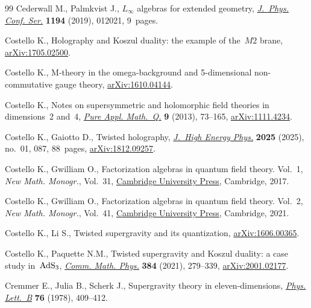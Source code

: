 \documentclass[10pt,a4paper]{amsart}
\numberwithin{equation}{section}
\theoremstyle{definition}
\begin{document}
\begin{thebibliography}{99}
Cederwall M., Palmkvist J., {$L_\infty$} algebras for extended geometry,
 \href{https://doi.org/10.1088/1742-6596/1194/1/012021}{\textit{J.~Phys. Conf.
 Ser.}} \textbf{1194} (2019), 012021, 9~pages.

Costello K., Holography and Koszul duality: the example of the~$M2$ brane,
 \href{http://arxiv.org/abs/1705.02500}{arXiv:1705.02500}.

Costello K., M-theory in the omega-background and 5-dimensional non-commutative
 gauge theory, \href{http://arxiv.org/abs/1610.04144}{arXiv:1610.04144}.

Costello K., Notes on supersymmetric and holomorphic field theories in
 dimensions~2 and~4,
 \href{https://doi.org/10.4310/PAMQ.2013.v9.n1.a3}{\textit{Pure Appl.
 Math.~Q.}} \textbf{9} (2013), 73--165,
 \href{http://arxiv.org/abs/1111.4234}{arXiv:1111.4234}.

Costello K., Gaiotto D., Twisted holography,
 \href{https://doi.org/10.1007/JHEP01(2025)087}{\textit{J.~High Energy Phys.}}
 \textbf{2025} (2025), no.~01, 087, 88~pages,
 \href{http://arxiv.org/abs/1812.09257}{arXiv:1812.09257}.

Costello K., Gwilliam O., Factorization algebras in quantum field theory.
 {V}ol.~1, \textit{New Math. Monogr.}, Vol.~31,
 \href{https://doi.org/10.1017/9781316678626}{Cambridge University Press},
 Cambridge, 2017.

Costello K., Gwilliam O., Factorization algebras in quantum field theory.
 {V}ol.~2, \textit{New Math. Monogr.}, Vol.~41,
 \href{https://doi.org/10.1017/9781316678664}{Cambridge University Press},
 Cambridge, 2021.

Costello K., Li S., Twisted supergravity and its quantization,
 \href{http://arxiv.org/abs/1606.00365}{arXiv:1606.00365}.

Costello K., Paquette N.M., Twisted supergravity and {K}oszul duality: a case
 study in~{$\rm AdS_3$},
 \href{https://doi.org/10.1007/s00220-021-04065-3}{\textit{Comm. Math. Phys.}}
 \textbf{384} (2021), 279--339,
 \href{http://arxiv.org/abs/2001.02177}{arXiv:2001.02177}.

Cremmer E., Julia B., Scherk J., Supergravity theory in eleven-dimensions,
 \href{https://doi.org/10.1016/0370-2693(78)90894-8}{\textit{Phys. Lett.~B}}
 \textbf{76} (1978), 409--412.


\end{thebibliography}
\end{document}
